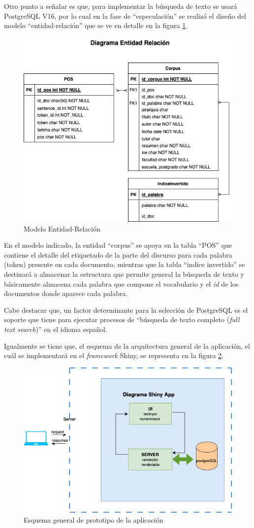 \documentclass[
  12pt,
  openany]{book}
\begin{document}
Otro punto a señalar es que, para implementar la búsqueda de texto se usará PostgreSQL V16, por lo cual en la fase de ``especulación'' se realizó el diseño del modelo ``entidad-relación'' que se ve en detalle en la figura \ref{fig:entrel}.

\begin{figure}

{\centering \includegraphics[width=0.6\linewidth]{images/05-desarrollo/2_ciclo/esquemas/diagrama_entidadrel} 

}

\caption{Modelo Entidad-Relación}\label{fig:entrel}
\end{figure}

En el modelo indicado, la entidad ``corpus'' se apoya en la tabla ``POS'' que contiene el detalle del etiquetado de la parte del discurso para cada palabra (token) presente en cada documento, mientras que la tabla ``indice invertido'' se destinará a almacenar la estructura que permite general la búsqueda de texto y básicamente almacena cada palabra que compone el vocabulario y el \emph{id} de los documentos donde aparece cada palabra.

Cabe destacar que, un factor determinante para la selección de PostgreSQL es el soporte que tiene para ejecutar procesos de ``búsqueda de texto completo (\emph{full text search})'' en el idioma español.

Igualmente se tiene que, el esquema de la arquitectura general de la aplicación, el cuál se implementará en el \emph{framework} Shiny, se representa en la figura \ref{fig:esqshinyproto}.

\begin{figure}

{\centering \includegraphics[width=0.5\linewidth]{images/05-desarrollo/2_ciclo/esquemas/shinyappproto} 

}

\caption{Esquema general de prototipo de la aplicación}\label{fig:esqshinyproto}
\end{figure}
\end{document}
